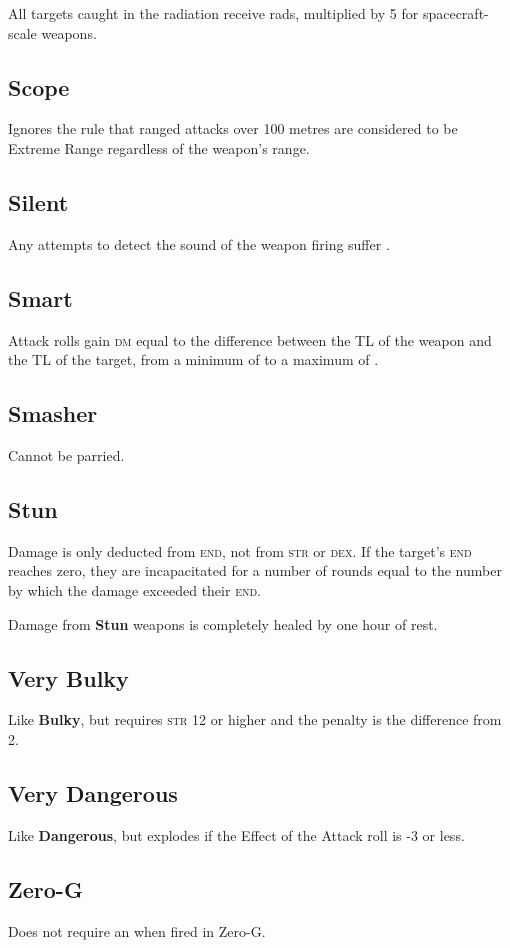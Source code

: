 \documentclass{cheatsheet}
\begin{document}
\begin{multicols}{3}
All targets caught in the radiation receive 
rads, multiplied by 5 for spacecraft-scale weapons.

\subsection{Scope}

Ignores the rule that ranged attacks over 100 metres are considered to
be Extreme Range regardless of the weapon's range.

\subsection{Silent}

Any attempts to detect the sound of the weapon firing suffer
.

\subsection{Smart}

Attack rolls gain \textsc{dm} equal to the difference between the TL
of the weapon and the TL of the target, from a minimum of 
to a maximum of .

\subsection{Smasher}

Cannot be parried.

\subsection{Stun}

Damage is only deducted from \textsc{end}, not from \textsc{str} or
\textsc{dex}.  If the target's \textsc{end} reaches zero, they are
incapacitated for a number of rounds equal to the number by which the
damage exceeded their \textsc{end}.

Damage from \textbf{Stun} weapons is completely healed by one hour of
rest.

\subsection{Very Bulky}

Like \textbf{Bulky}, but requires \textsc{str} 12 or higher and the
penalty is the difference from 2.

\subsection{Very Dangerous}

Like \textbf{Dangerous}, but explodes if the Effect of the Attack roll
is -3 or less.

\subsection{Zero-G}

Does not require an  when fired in Zero-G.
\end{multicols}
\end{document}
